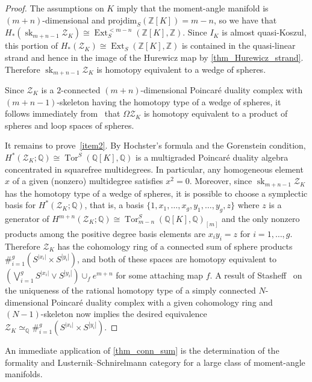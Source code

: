 \documentclass[a4paper,10pt]{amsart}
\theoremstyle{definition}
\theoremstyle{remark}
\newcommand{\pd}{\mathrm{projdim}}
\DeclareMathOperator{\Ext}{Ext}
\DeclareMathOperator{\Tor}{Tor}
\begin{document}
\begin{proof}
The assumptions on $K$ imply that the moment-angle manifold  is $(m+n)$-dimensional and $\pd_S(\mathbb{Z}[K])=m-n$, so we have that $H_*(\operatorname{sk}_{m+n-1}\mathcal{Z}_K) \cong \Ext_S^{<m-n}(\mathbb{Z}[K],\mathbb{Z})$. Since $I_K$ is almost quasi-Koszul, this portion of $H_*(\mathcal{Z}_K)\cong \Ext_S(\mathbb{Z}[K],\mathbb{Z})$ is contained in the quasi-linear strand and hence in the image of the Hurewicz map by \cref{thm_Hurewicz_strand}. Therefore $\operatorname{sk}_{m+n-1}\mathcal{Z}_K$ is homotopy equivalent to a wedge of spheres.

Since $\mathcal{Z}_K$ is a $2$-connected $(m+n)$-dimensional Poincar\'e duality complex with $(m+n-1)$-skeleton having the homotopy type of a wedge of spheres, it follows immediately from~\cite[Proposition~3.2]{BT} that $\Omega\mathcal{Z}_K$ is homotopy equivalent to a product of spheres and loop spaces of spheres.

It remains to prove~\ref{item2}. By Hochster's formula and the Gorenstein condition, $H^*(\mathcal{Z}_K;\mathbb{Q})\cong \Tor^S(\mathbb{Q}[K],\mathbb{Q})$ is a multigraded Poincar\'e duality algebra concentrated in squarefree multidegrees. In particular, any homogeneous element $x$ of a given (nonzero) multidegree satisfies $x^2=0$. Moreover, since $\operatorname{sk}_{m+n-1}\mathcal{Z}_K$ has the homotopy type of a wedge of spheres, it is possible to choose a symplectic basis for $H^*(\mathcal{Z}_K;\mathbb{Q})$, that is, a basis $\{1,x_1,\ldots,x_g,y_1,\ldots,y_g,z\}$ where $z$ is a generator of $H^{m+n}(\mathcal{Z}_K;\mathbb{Q})\cong \Tor^S_{m-n}(\mathbb{Q}[K],\mathbb{Q})_{[m]}$ and the only nonzero products among the positive degree basis elements are $x_iy_i=z$ for $i=1,\ldots,g$. Therefore $\mathcal{Z}_K$ has the cohomology ring of a connected sum of sphere products $\#_{i=1}^g (S^{|x_i|}\times S^{|y_i|})$, and both of these spaces are homotopy equivalent to $(\bigvee_{i=1}^gS^{|x_i|}\vee S^{|y_i|}) \cup_f e^{m+n}$ for some attaching map $f$. A result of Stasheff~\cite[Theorem~1]{St} on the uniqueness of the rational homotopy type of a simply connected $N$-dimensional Poincar\'e duality complex with a given cohomology ring and $(N-1)$-skeleton now implies the desired equivalence $\mathcal{Z}_K \simeq_\mathbb{Q} \#_{i=1}^g (S^{|x_i|}\times S^{|y_i|})$.
\end{proof}

An immediate application of \cref{thm_conn_sum} is the determination of the formality and Lusternik--Schnirelmann category for a large class of moment-angle manifolds.
\end{document}
